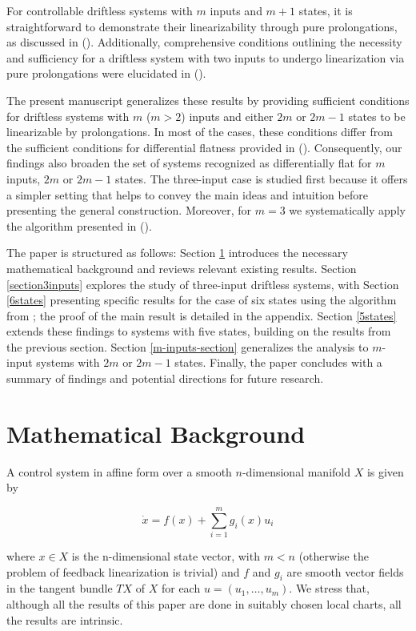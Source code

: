 \documentclass[10pt]{article}
\newcommand{\3}{\mathbf{3}}
\newcommand{\2}{\mathbf{2}}
\newcommand{\1}{\mathbf{1}}
\newcommand{\0}{\mathbf{0}}
\begin{document}
For controllable driftless systems with $m$ inputs and $m+1$ states, it is straightforward to demonstrate their linearizability through pure prolongations, as discussed in (\cite{IJC2008}). Additionally, comprehensive conditions outlining the necessity and sufficiency for a driftless system with two inputs to undergo linearization via pure prolongations were elucidated in (\cite{CDC2000}).

The present manuscript generalizes these results by providing sufficient conditions for driftless systems with $m$ ($m>2$) inputs and either $2m$ or $2m-1$ states to be linearizable by prolongations. In most of the cases, these conditions differ from the sufficient conditions for differential flatness provided in (\cite{MR94}). Consequently, our findings also broaden the set of systems recognized as differentially flat for $m$ inputs, $2m$ or $2m-1$  states. The three-input case is studied first because it offers a simpler setting that helps to convey the main ideas and intuition before presenting the general construction. Moreover, for $m = 3$ we systematically apply the algorithm presented in (\cite{Levine2023}).

The paper is structured as follows: Section \ref{background} introduces the necessary mathematical background and reviews relevant existing results. Section \ref{section3inputs} explores the study of three-input driftless systems, with Section \ref{6states} presenting specific results for the case of six states using the algorithm from \cite{Levine2023}; the proof of the main result is detailed in the appendix. Section \ref{5states} extends these findings to systems with five states, building on the results from the previous section. Section \ref{m-inputs-section} generalizes the analysis to $m$-input systems with $2m$ or $2m-1$ states. Finally, the paper concludes with a summary of findings and potential directions for future research.


\section{Mathematical Background}
\label{background}

A control system in affine form over a smooth $n$-dimensional manifold $X$  is given by

\begin{equation} \dot{x}=f(x)+\sum_{i=1}^{m} g_i(x)u_i \label{affine} \end{equation}

where $x \in X$ is the n-dimensional state vector,  with $m < n$ (otherwise the problem of feedback linearization is trivial) and $f$ and $g_i$ are smooth vector fields in the tangent bundle $TX$ of $X$ for each $u=(u_1,\dots,u_m)$. We stress that, although all the results of this paper are done in suitably chosen local charts, all the results are intrinsic.
\end{document}
